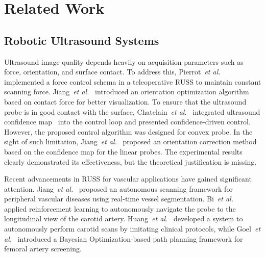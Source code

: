 \section{Related Work}
\subsection{Robotic Ultrasound Systems}
Ultrasound image quality depends heavily on acquisition parameters such as force, orientation, and surface contact. To address this, Pierrot~\emph{et al.}~\cite{pierrot1999hippocrate} implemented a force control schema in a teleoperative RUSS to maintain constant scanning force. Jiang~\emph{et al.}~\cite{jiang2020automatic} introduced an orientation optimization algorithm based on contact force for better visualization.
To ensure that the ultrasound probe is in good contact with the surface, Chatelain~\emph{et al.}~\cite{chatelain2017confidence} integrated ultrasound confidence map~\cite{karamalis2012ultrasound} into the control loop and presented confidence-driven control. However, the proposed control algorithm was designed for convex probe. In the sight of such limitation, Jiang~\emph{et al.}~\cite{jiang2022precise} proposed an orientation correction method based on the confidence map for the linear probes. The experimental results clearly demonstrated its effectiveness, but the theoretical justification is missing.

\par
Recent advancements in RUSS for vascular applications have gained significant attention. Jiang~\emph{et al.}~\cite{jiang2021autonomous} proposed an autonomous scanning framework for peripheral vascular diseases using real-time vessel segmentation. Bi~\emph{et al.}~\cite{bi2022vesnet} applied reinforcement learning to autonomously navigate the probe to the longitudinal view of the carotid artery. Huang~\emph{et al.}~\cite{huangQ2024robot} developed a system to autonomously perform carotid scans by imitating clinical protocols, while Goel~\emph{et al.}~\cite{goel2022autonomous} introduced a Bayesian Optimization-based path planning framework for femoral artery screening.

\par
{}

